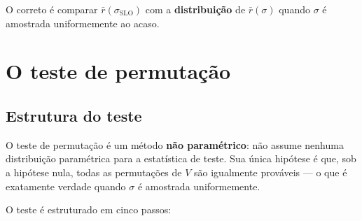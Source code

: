 \documentclass[a4paper,11pt]{article}
\begin{document}
O correto é comparar $\bar{r}(\sigma_{\text{SLO}})$ com a
\textbf{distribuição} de $\bar{r}(\sigma)$ quando $\sigma$ é amostrada
uniformemente ao acaso.

\section{O teste de permutação}

\subsection{Estrutura do teste}

O teste de permutação é um método \textbf{não paramétrico}: não assume
nenhuma distribuição paramétrica para a estatística de teste. Sua única
hipótese é que, sob a hipótese nula, todas as permutações de $V$ são
igualmente prováveis — o que é exatamente verdade quando $\sigma$ é
amostrada uniformemente.

\medskip
\noindent O teste é estruturado em cinco passos:
\end{document}
